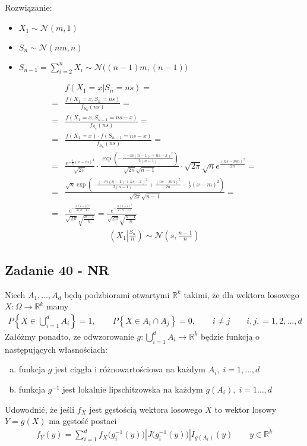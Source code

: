 Rozwiązanie:
\begin{itemize}
\item $ X_1\sim \mathcal N(m,1) $
\item $ S_n\sim \mathcal N(nm,n) $
\item $ S_{n-1}=\sum_{i=2}^{n}X_i\sim \mathcal N\bigl((n-1)m,(n-1)\bigr) $
\end{itemize}
\begin{align*}
&f(X_1=x|S_n=ns)
=\\=&
\frac{f(X_1=x,S_n=ns)}{f_{S_n}(ns)}
=\\=&
\frac{f(X_1=x,S_{n-1}=ns-x)}{f_{S_n}(ns)}
=\\=&
\frac{f(X_1=x)\cdot f(S_{n-1}=ns-x)}{f_{S_n}(ns)}
=\\=&
\frac{e^{-\frac{1}{2} (x-m)^2}}{\sqrt{2 \pi }}\cdot
\frac{\exp\left(-\frac{(-m (n-1)+n s-x)^2}{2 (n-1)}\right)}{\sqrt{2 \pi }\sqrt{n-1}}\cdot
\sqrt{2 \pi } \sqrt{n} e^{\frac{(n s-m n)^2}{2 n}}
=\\=&
\frac{\sqrt{n} \exp \left(-\frac{(-m (n-1)+n s-x)^2}{2 (n-1)}+\frac{(n s-m n)^2}{2 n}-\frac{1}{2} (x-m)^2\right)}{\sqrt{2 \pi } \sqrt{n-1}}
=\\=&
\frac{e^{-\frac{n (s-x)^2}{2 (n-1)}}}{\sqrt{2 \pi } \sqrt{\frac{n-1}{n}}}
=
\frac{e^{-\frac{n (x-s)^2}{2 (n-1)}}}{\sqrt{2 \pi } \sqrt{\frac{n-1}{n}}}
\end{align*}
\begin{gather*}
\left(X_1\left |\frac{S_n}{n}\right .\right)\sim\mathcal N\left(s,\frac{n-1}{n}\right)
\end{gather*}


\subsection*{Zadanie 40 - NR}
Niech $ A_1,\dots,A_d $  będą podzbiorami otwartymi $ \mathbb R ^k $ takimi, że dla wektora losowego $ X:\Omega\to \mathbb R ^k $ mamy
\begin{gather*}
P\left\{X\in\bigcup_{i=1}^d A_i\right\}=1,\qquad
P\left\{X\in A_i\cap A_j\right\}=0,
\qquad
i\neq j
\qquad
i,j,=1,2,\dots,d
\end{gather*}
Załóżmy ponadto, ze odwzorowanie $ g:\bigcup_{i=1}^d A_i\to \mathbb R ^k $ będzie funkcją o następujących własnościach:
\begin{enumerate}[a)]
\item funkcja $ g $ jest ciągła i różnowartościowa na każdym $ A_i,\; i=1,\dots,d $
\item funkcja $ g^{-1} $ jest lokalnie lipschitzowska na każdym $ g(A_i),\;i=1\dots,d $
\end{enumerate}
Udowodnić, że jeśli $ f_X $ jest gęstością wektora losowego $ X $ to wektor losowy $ Y=g(X) $ ma gęstość postaci
\begin{gather*}
f_Y(y)=\sum_{i=1}^{d}f_X\bigl(g_i^{-1}(y)\bigr)\left|J\bigl(g_i^{-1}(y)\bigr)\right|I_{g(A_i)}(y)\qquad
y\in \mathbb R ^k
\end{gather*}

